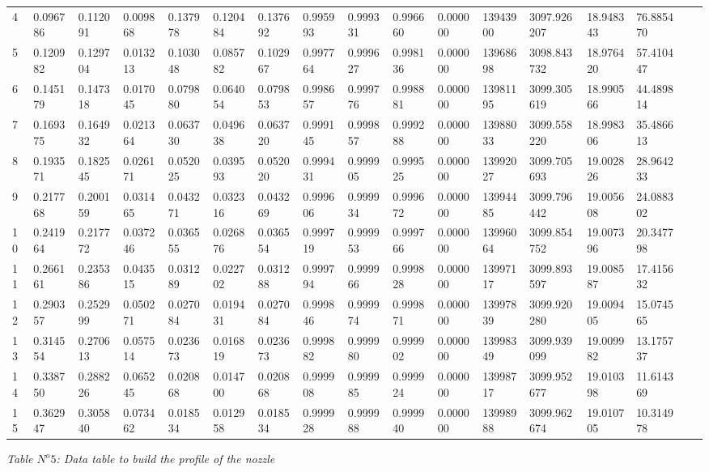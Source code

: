 \begin{center}
\begin{tabular}{|l*{16}{l|}}
4 & 0.096786 & 0.112091 & 0.009868 & 0.137978 & 0.120484 & 0.137692 & 0.995993 & 0.999331 & 0.996660 & 0.000000 & 13943900 & 3097.926207 & 18.948343 & 76.885470 \\
5 & 0.120982 & 0.129704 & 0.013213 & 0.103048 & 0.085782 & 0.102967 & 0.997764 & 0.999627 & 0.998136 & 0.000000 & 13968698 & 3098.843732 & 18.976420 & 57.410447 \\
6 & 0.145179 & 0.147318 & 0.017045 & 0.079880 & 0.064054 & 0.079853 & 0.998657 & 0.999776 & 0.998881 & 0.000000 & 13981195 & 3099.305619 & 18.990566 & 44.489814 \\
7 & 0.169375 & 0.164932 & 0.021364 & 0.063730 & 0.049638 & 0.063720 & 0.999145 & 0.999857 & 0.999288 & 0.000000 & 13988033 & 3099.558220 & 18.998306 & 35.486613 \\
8 & 0.193571 & 0.182545 & 0.026171 & 0.052025 & 0.039593 & 0.052020 & 0.999431 & 0.999905 & 0.999525 & 0.000000 & 13992027 & 3099.705693 & 19.002826 & 28.964233 \\
9 & 0.217768 & 0.200159 & 0.031465 & 0.043271 & 0.032316 & 0.043269 & 0.999606 & 0.999934 & 0.999672 & 0.000000 & 13994485 & 3099.796442 & 19.005608 & 24.088302 \\
10 & 0.241964 & 0.217772 & 0.037246 & 0.036555 & 0.026876 & 0.036554 & 0.999719 & 0.999953 & 0.999766 & 0.000000 & 13996064 & 3099.854752 & 19.007396 & 20.347798 \\
11 & 0.266161 & 0.235386 & 0.043515 & 0.031289 & 0.022702 & 0.031288 & 0.999794 & 0.999966 & 0.999828 & 0.000000 & 13997117 & 3099.893597 & 19.008587 & 17.415632 \\
12 & 0.290357 & 0.252999 & 0.050271 & 0.027084 & 0.019431 & 0.027084 & 0.999846 & 0.999974 & 0.999871 & 0.000000 & 13997839 & 3099.920280 & 19.009405 & 15.074565 \\
13 & 0.314554 & 0.270613 & 0.057514 & 0.023673 & 0.016819 & 0.023673 & 0.999882 & 0.999980 & 0.999902 & 0.000000 & 13998349 & 3099.939099 & 19.009982 & 13.175737 \\
14 & 0.338750 & 0.288226 & 0.065245 & 0.020868 & 0.014700 & 0.020868 & 0.999908 & 0.999985 & 0.999924 & 0.000000 & 13998717 & 3099.952677 & 19.010398 & 11.614369 \\
15 & 0.362947 & 0.305840 & 0.073462 & 0.018534 & 0.012958 & 0.018534 & 0.999928 & 0.999988 & 0.999940 & 0.000000 & 13998988 & 3099.962674 & 19.010705 & 10.314978 \\
\hline
\end{tabular}
\end{center}
\begin{flushright}
\textit{ Table $N^o 5$: Data table to build the profile of the nozzle } \\
\end{flushright}
